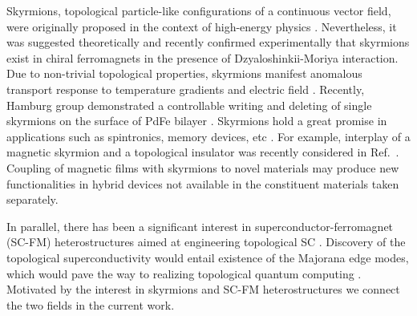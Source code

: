 \documentclass[twocolumn,showpacs,floatfix,longbibliography]{revtex4-1}
\begin{document}
Skyrmions, topological particle-like configurations of a continuous vector field, were originally proposed in the context of high-energy physics \cite{Skyrme}.  Nevertheless, it was suggested theoretically \cite{Bogdanov1989,Rossler2006} and recently confirmed experimentally \cite{Muhlbauer2009,Munzer2010,Yu2011,Heinze2011,Seki2012} that skyrmions exist in chiral ferromagnets in the presence of Dzyaloshinkii-Moriya interaction. Due to non-trivial topological properties, skyrmions manifest anomalous transport response to temperature gradients \cite{Jonietz2010} and electric field \cite{Neubauer2009,Zang2011,Saxena2013}. Recently, Hamburg group demonstrated a controllable writing and deleting of single skyrmions on the surface of PdFe bilayer \cite{Romming2013,Bergmann2014,Romming2015}.  Skyrmions hold a great promise in applications such as spintronics, memory devices, etc \cite{Fert2013,Nagaosa2013}. For example, interplay of a magnetic skyrmion and a topological insulator was recently considered in Ref.~\cite{Hurst2015}. Coupling of magnetic films with skyrmions to novel materials may produce new functionalities in hybrid devices not available in the constituent materials taken separately.


In parallel, there has been a significant interest in superconductor-ferromagnet (SC-FM) heterostructures aimed at engineering topological SC \cite{Alicea2012,Beenakker}. Discovery of the topological superconductivity would entail existence of the Majorana edge modes, which would pave the way to realizing topological quantum computing \cite{Nayak2008}. Motivated by the interest in skyrmions and SC-FM heterostructures  we connect the two fields in the current work.
\end{document}

